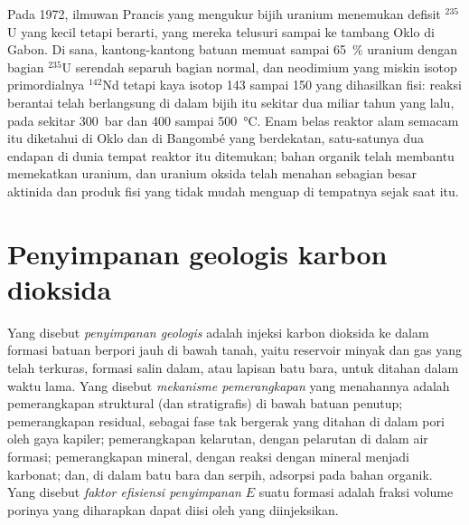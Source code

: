 \begin{history}
Pada 1972, ilmuwan Prancis yang mengukur bijih uranium menemukan defisit $^{235}$U yang kecil tetapi berarti,
yang mereka telusuri sampai ke tambang Oklo di Gabon. Di sana, kantong-kantong batuan memuat sampai
\qty{65}{\percent} uranium dengan bagian $^{235}$U serendah separuh bagian normal, dan neodimium
yang miskin isotop primordialnya $^{142}$Nd tetapi kaya isotop 143 sampai 150 yang dihasilkan
fisi: reaksi berantai telah berlangsung di dalam bijih itu sekitar dua miliar tahun yang lalu, pada sekitar \qty{300}{bar}
dan 400 sampai \qty{500}{\celsius}. Enam belas reaktor alam semacam itu diketahui di Oklo dan di
Bangombé yang berdekatan, satu-satunya dua endapan di dunia tempat reaktor itu ditemukan; bahan organik telah membantu
memekatkan uranium, dan uranium oksida telah menahan sebagian besar aktinida dan
produk fisi yang tidak mudah menguap di tempatnya sejak saat itu.
\end{history}

\section{Penyimpanan geologis karbon dioksida}\label{sec:b2:energy-geology:ccs}

\begin{definition}\label{def:b2:energy-geology:ccs}
Yang disebut \emph{penyimpanan  geologis} adalah injeksi karbon
dioksida ke dalam formasi batuan berpori jauh di bawah tanah, yaitu reservoir minyak dan gas yang telah terkuras, formasi salin
dalam, atau lapisan batu bara, untuk ditahan dalam waktu lama. Yang disebut \emph{mekanisme pemerangkapan
} yang menahannya adalah pemerangkapan struktural (dan stratigrafis)
di bawah batuan penutup; pemerangkapan residual, sebagai fase tak bergerak yang ditahan di dalam pori oleh gaya
kapiler; pemerangkapan kelarutan, dengan pelarutan di dalam air formasi; pemerangkapan mineral, dengan reaksi
dengan mineral menjadi karbonat; dan, di dalam batu bara dan serpih, adsorpsi pada bahan organik.
Yang disebut \emph{faktor efisiensi penyimpanan} $E$ suatu formasi adalah fraksi volume porinya yang diharapkan
dapat diisi oleh  yang diinjeksikan.
\end{definition}

